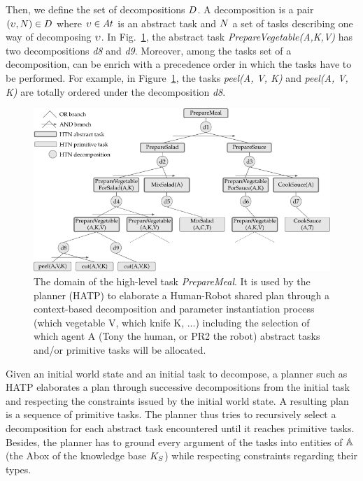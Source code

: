 Then, we define the set of decompositions $D$. A decomposition is a pair $(\upsilon, N) \in D$ where $\upsilon \in At$ is an abstract task and $N$ a set of tasks describing one way of decomposing $\upsilon$. In Fig.~\ref{fig:chap6_domain}, the abstract task \textit{PrepareVegetable(A,K,V)} has two decompositions \textit{d8} and \textit{d9}. Moreover, among the tasks set of a decomposition, can be enrich with a precedence order in which the tasks have to be performed. For example, in Figure~\ref{fig:chap6_domain}, the tasks \textit{peel(A, V, K)} and \textit{peel(A, V, K)} are totally ordered under the decomposition \textit{d8}. 

\begin{figure}[h!]
\centering
\includegraphics[width=\textwidth]{figures/chapter6/domain.png}
\caption{\label{fig:chap6_domain} The  domain of the high-level task \textit{PrepareMeal}. It is used by the planner (HATP) to elaborate a Human-Robot shared plan through a context-based decomposition and parameter instantiation process (which vegetable V, which knife K, ...) including the selection of which agent A (Tony the human, or PR2 the robot) abstract tasks and/or primitive tasks will be allocated.}
\end{figure}

Given an initial world state and an initial task to decompose, a planner such as HATP elaborates a plan through successive decompositions from the initial task and respecting the constraints issued by the initial world state. A resulting plan is a sequence of primitive tasks. The planner thus tries to recursively select a decomposition for each abstract task encountered until it reaches primitive tasks. Besides, the planner has to ground every argument of the tasks into entities of $\mathbb{A}$ (the Abox of the knowledge base $K_S$) while respecting constraints regarding their types.

